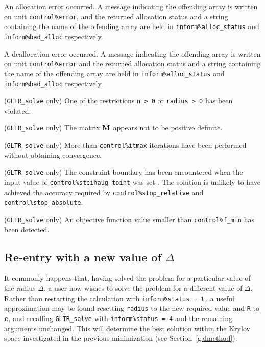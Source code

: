 \documentclass{galahad}
\newcommand{\packagename}{GL\-TR}
\begin{document}
\begin{description}
 An allocation error occurred. A message indicating
the offending
array is written on unit {\tt control\%error}, and the returned allocation
status and a string containing the name of the offending array
are held in {\tt inform\%alloc\_\-status}
and {\tt inform\%bad\_alloc} respectively.

 A deallocation error occurred.
A message indicating the offending
array is written on unit {\tt control\%error} and the returned allocation
status and a string containing the name of the offending array
are held in {\tt inform\%alloc\_\-status}
and {\tt inform\%bad\_alloc} respectively.

 ({\tt \packagename\_solve} only)
One of the restrictions
{\tt n > 0}
or
{\tt radius > 0}
has been violated.

 ({\tt \packagename\_solve} only)
The matrix ${\mathbf{M}}$ appears not to be positive definite.

 ({\tt \packagename\_solve} only) More than
{\tt control\%itmax} iterations have been performed without obtaining
convergence.

 ({\tt \packagename\_solve} only)
The constraint boundary has been
encountered when the input value of {\tt control\%steihaug\-\_\-toint} was
set \true. The
solution is unlikely to have achieved the accuracy required by
{\tt control\%stop\_rela\-tive} and {\tt control\%stop\_absolute}.

\itt{\galerrfmin} ({\tt \packagename\_solve} only)
An objective function value smaller than {\tt control\%f\_min} has
been detected.

\end{description}


\subsection{Re-entry with a new value of $\Delta$}
It commonly happens that, having solved the problem for a particular value
of the radius $\Delta$, a user now wishes to solve the problem for a different
value of $\Delta$. Rather than restarting the calculation with
{\tt inform\%status = 1,} a useful approximation may be found
resetting {\tt radius} to the new required value and {\tt R} to ${\mathbf{c}}$,
and recalling {\tt \packagename\_solve}
with {\tt inform\%status = 4} and the remaining arguments unchanged.
This will determine the best solution within the Krylov space investigated
in the previous minimization (see Section~\ref{galmethod}).
\end{document}
